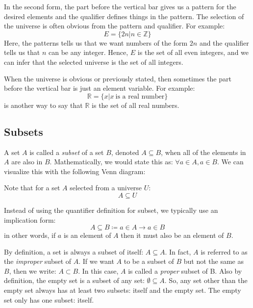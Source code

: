 \documentclass[letterpaper,12pt,fleqn]{article}
\begin{document}
In the second form, the part before the vertical bar gives us a pattern for the
desired elements and the qualifier defines things in the pattern. The selection
of the universe is often obvious from the pattern and qualifier. For example:
\[E=\{2n|n\in\mathbb{Z}\}\]
Here, the patterns tells us that we want numbers of the form $2n$ and the
qualifier tells us that $n$ can be any integer. Hence, $E$ is the set of all
even integers, and we can infer that the selected universe is the set of all
integers.

When the universe is obvious or previously stated, then sometimes the part
before the vertical bar is just an element variable.  For example:
\[\mathbb{R}=\{x|x\ \mbox{is a real number}\}\]
is another way to say that $\mathbb{R}$ is the set of all real numbers.

\subsection*{Subsets}

A set $A$ is called a \emph{subset} of a set $B$, denoted $A\subseteq B$, when
all of the elements in $A$ are also in $B$.  Mathematically, we would state
this as: $\forall a\in A, a\in B$. We can visualize this with the following
Venn diagram:

\begin{center}
\end{center}

Note that for a set $A$ selected from a universe $U$:
\[A\subseteq U\]

Instead of using the quantifier definition for subset, we typically use an
implication form:
\[A\subseteq B\coloneqq a\in A\rightarrow a\in B\]
in other words, if $a$ is an element of $A$ then it must also be an element of
$B$.

By definition, a set is always a subset of itself: $A\subseteq A$. In fact, $A$
is referred to as the \emph{improper} subset of $A$. If we want $A$ to be a
subset of $B$ but not the same as $B$, then we write: $A\subset B$. In this
case, $A$ is called a \emph{proper} subset of B. Also by definition, the
empty set is a subset of any set: $\emptyset\subseteq A$. So, any set other
than the empty set always has at least two subsets: itself and the empty set.
The empty set only has one subset: itself.
\end{document}
